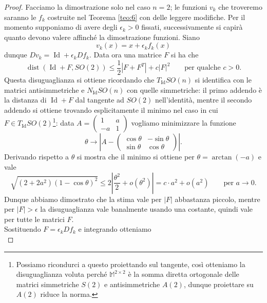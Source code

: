 \documentclass[a4paper,11pt]{book}
\theoremstyle{plain}
\theoremstyle{definition}
\theoremstyle{remark}
\newcommand{\M}{\mathbb{M}}
\DeclareMathOperator{\Id}{Id}
\DeclareMathOperator{\dist}{dist}
\begin{document}
\begin{proof}
	Facciamo la dimostrazione solo nel caso $n=2$; le funzioni $v_k$ che troveremo saranno le $f_k$ costruite nel Teorema \ref{teo:6} con delle leggere modifiche. Per il momento supponiamo di avere degli $\epsilon_k>0$ fissati, successivamente si capirà quanto devono valere affinché la dimostrazione funzioni. Siano
	\[
		v_k(x) = x+\epsilon_kf_k(x)
	\]
	dunque $Dv_k=\Id+\epsilon_kDf_k$. Data ora una matrice $F$ si ha che
	\[
		\dist(\Id+F,SO(2))\leq \frac{1}{2}|F+F^T|+c|F|^2\qquad \text{per qualche }c>0.
	\]
	Questa disuguaglianza si ottiene ricordando che $T_{\Id}SO(n)$ si identifica con le matrici antisimmetriche e $N_{\Id}SO(n)$ con quelle simmetriche: il primo addendo è la distanza di $\Id+F$ dal tangente ad $SO(2)$ nell'identità, mentre il secondo addendo si ottiene trovando esplicitamente il minimo nel caso in cui $F\in T_{\Id}SO(2)$\footnote{Possiamo ricondurci a questo proiettando sul tangente, così otteniamo la disuguaglianza voluta perché $\M^{2\times 2}$ è la somma diretta ortogonale delle matrici simmetriche $S(2)$ e antisimmetriche $A(2)$, dunque proiettare su $A(2)$ riduce la norma.}: data $A=\begin{pmatrix}
			1 & a\\
			-a&1
		\end{pmatrix}$ vogliamo minimizzare la funzione
	\[
		\theta\to\left|A-\begin{pmatrix}
		                 	\cos\theta&-\sin\theta\\
		                 	\sin\theta&\cos\theta
		                 \end{pmatrix}\right|.
	\]
	Derivando rispetto a $\theta$ si mostra che il minimo si ottiene per $\theta=\arctan(-a)$ e vale 
	\[
		\sqrt{(2+2a^2)(1-\cos\theta)^2} \leq 2\left|\frac{\theta^2}{2}+o(\theta^2)\right| = c\cdot a^2+o(a^2)\qquad \text{per }a\to0.
	\]
	Dunque abbiamo dimostrato che la stima vale per $|F|$ abbastanza piccolo, mentre per $|F|>\epsilon$ la disuguaglianza vale banalmente usando una costante, quindi vale per tutte le matrici $F$.
	\\	
	Sostituendo $F=\epsilon_kDf_k$ e integrando otteniamo
	\begin{equation}\label{eq:1}

\end{equation}
\end{proof}
\end{document}
